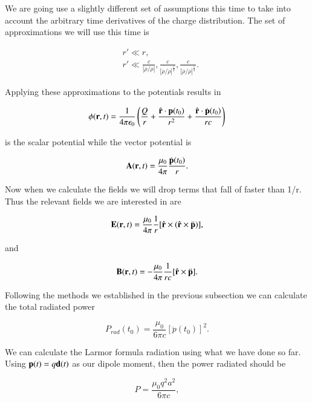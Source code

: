 \documentclass[preprint, review,12pt]{elsarticle}
\def\k{\frac{1}{4 \pi \epsilon_0}}
\def\m{\frac{\mu_0}{4\pi}}
\def\x{\times}
\def\.{\cdot}
\def\b{\textbf}
\def\9{\left(}
\def\0{\right)}
\newcommand{\hb}[1]{\hat{\b #1}}
\begin{document}
We are going use a slightly different set of assumptions this time to take into account the arbitrary time derivatives of the charge distribution. The set of approximations we will use this time is 

\begin{equation*}
\begin{split}
    & r' \ll r, \\
    & r' \ll \frac{c}{|\ddot{\rho}/\dot{\rho}|}, \frac{c}{|\dddot{\rho}/\dot{\rho}|^\frac{1}{2}}, \frac{c}{|\ddddot{\rho}/\dot{\rho}|^\frac{1}{3}}.
\end{split}
\end{equation*}

Applying these approximations to the potentials results in

\begin{equation}
    \phi(\b r, t) = \k \9 \frac{Q}{r} + \frac{\hb{r} \. \b p(t_0)}{r^2} + \frac{\hb{r} \. \dot{\b p}(t_0)}{rc} \0
\end{equation}

is the scalar potential while the vector potential is

\begin{equation}
    \b A(\b r,t) = \m \frac{\dot{\b p}(t_0)}{r}.
\end{equation}

Now when we calculate the fields we will drop terms that fall of faster than 1/r. Thus the relevant fields we are interested in are

\begin{equation}
    \b E(\b r,t) = \m \frac{1}{r} [\hb{r} \x (\hb{r} \x \ddot{\b p})],
\end{equation}

and

\begin{equation}
    \b B(\b r , t) = -\m \frac{1}{rc}[\hb{r} \x \ddot{\b p}].
\end{equation}

Following the methods we established in the previous subsection we can calculate the total radiated power

\begin{equation}
    P_{rad}(t_0) = \frac{\mu_0}{6 \pi c}[\ddot{p}(t_0)]^2.
\end{equation}

We can calculate the Larmor formula radiation using what we have done so far. Using $\b p(t) = q \b d(t)$ as our dipole moment, then the power radiated should be 

\begin{equation}
    P = \frac{\mu_0 q^2 a^2}{6 \pi c},
\end{equation}
\end{document}
